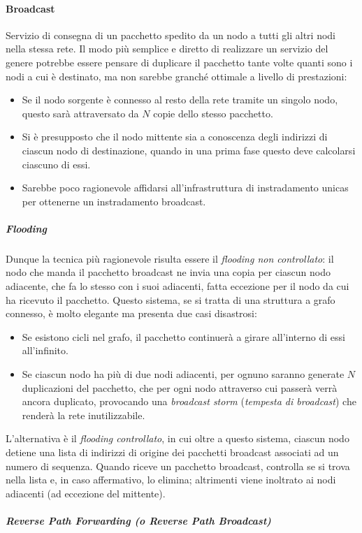 \paragraph{Broadcast}
Servizio di consegna di un pacchetto spedito da un nodo a tutti gli altri nodi nella stessa rete.
Il modo più semplice e diretto di realizzare un servizio del genere potrebbe essere pensare di duplicare il pacchetto tante volte quanti sono i nodi a cui è destinato, ma non sarebbe granché ottimale a livello di prestazioni:
\begin{itemize}
	\item Se il nodo sorgente è connesso al resto della rete tramite un singolo nodo, questo sarà attraversato da $N$ copie dello stesso pacchetto.
	\item Si è presupposto che il nodo mittente sia a conoscenza degli indirizzi di ciascun nodo di destinazione, quando in una prima fase questo deve calcolarsi ciascuno di essi.
	\item Sarebbe poco ragionevole affidarsi all'infrastruttura di instradamento unicas per ottenerne un instradamento broadcast.
\end{itemize}
\subparagraph{Flooding}
Dunque la tecnica più ragionevole risulta essere il \textit{flooding non controllato}: il nodo che manda il pacchetto broadcast ne invia una copia per ciascun nodo adiacente, che fa lo stesso con i suoi adiacenti, fatta eccezione per il nodo da cui ha ricevuto il pacchetto. Questo sistema, se si tratta di una struttura a grafo connesso, è molto elegante ma presenta due casi disastrosi:
\begin{itemize}
	\item Se esistono cicli nel grafo, il pacchetto continuerà a girare all'interno di essi all'infinito.
	\item Se ciascun nodo ha più di due nodi adiacenti, per ognuno saranno generate $N$ duplicazioni del pacchetto, che per ogni nodo attraverso cui passerà verrà ancora duplicato, provocando una \textit{broadcast storm} (\textit{tempesta di broadcast}) che renderà la rete inutilizzabile.
\end{itemize}
L'alternativa è il \textit{flooding controllato}, in cui oltre a questo sistema, ciascun nodo detiene una lista di indirizzi di origine dei pacchetti broadcast associati ad un numero di sequenza. Quando riceve un pacchetto broadcast, controlla se si trova nella lista e, in caso affermativo, lo elimina; altrimenti viene inoltrato ai nodi adiacenti (ad eccezione del mittente). \\
\subparagraph{Reverse Path Forwarding (o Reverse Path Broadcast)}
